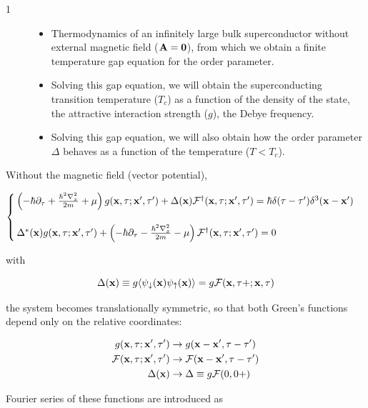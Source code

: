 \begin{description}
\item[1] \hfill
\begin{itemize}
\item Thermodynamics of an infinitely large bulk superconductor without external magnetic field ($\bf A=0$), from which we obtain a finite temperature gap equation for the order parameter. 
\item Solving this gap equation, we will obtain the superconducting transition temperature ($T_c$) as a function of the density of the state, the attractive interaction strength ($g$), the Debye frequency. 
\item Solving this gap equation, we will also obtain how the order parameter $\Delta$ behaves as a function of the temperature ($T<T_c$). 
\end{itemize}
\end{description}

Without the magnetic field (vector potential), 

\[
\begin{cases}
\left(-\hbar\partial_\tau + \frac{\hbar^2\nabla_x^2}{2m}+\mu\right)g({\bf x},\tau;{\bf x'},\tau')+\Delta({\bf x})\mathcal{F}^\dagger({\bf x},\tau;{\bf x'},\tau') = \hbar\delta(\tau-\tau')\delta^3({\bf x}-{\bf x}')\\
\ \\
\Delta^*({\bf x})g({\bf x},\tau;{\bf x'},\tau') + \left(-\hbar\partial_\tau - \frac{\hbar^2\nabla_x^2}{2m}-\mu\right)\mathcal{F}^\dagger({\bf x},\tau;{\bf x'},\tau')  = 0
\end{cases}
\]

with

\[\Delta({\bf x}) \equiv g\langle\psi_\downarrow({\bf x})\psi_\uparrow({\bf x})\rangle = g\mathcal F({\bf x},\tau+;{\bf x},\tau) \]

the system becomes translationally symmetric, so that both Green's functions depend only on the relative coordinates:

\[\begin{split}
g({\bf x},\tau;{\bf x'},\tau')&\rightarrow g({\bf x-x'},\tau-\tau')\\
\mathcal{F}({\bf x},\tau;{\bf x'},\tau')&\rightarrow\mathcal{F}({\bf x-x'},\tau-\tau')\\
\Delta({\bf x})&\rightarrow\Delta\equiv g\mathcal{F}(0,0+)
\end{split} \]

Fourier series of these functions are introduced as

